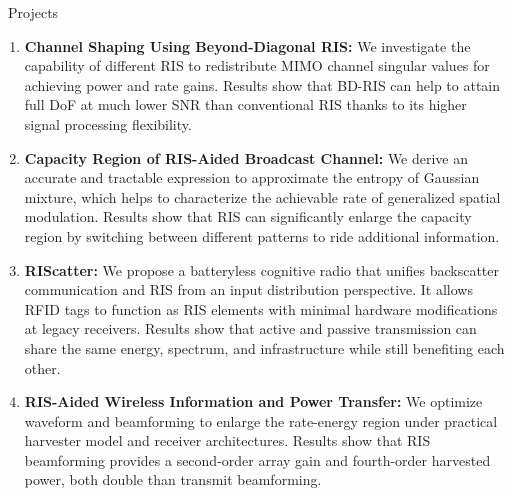 \documentclass{cv}
\begin{document}
\begin{section}{\faPaperPlane\ Projects}
	\begin{enumerate}
		\item \textbf{Channel Shaping Using Beyond-Diagonal RIS:} We investigate the capability of different RIS to redistribute MIMO channel singular values for achieving power and rate gains. Results show that BD-RIS can help to attain full DoF at much lower SNR than conventional RIS thanks to its higher signal processing flexibility.
		\item \textbf{Capacity Region of RIS-Aided Broadcast Channel:} We derive an accurate and tractable expression to approximate the entropy of Gaussian mixture, which helps to characterize the achievable rate of generalized spatial modulation. Results show that RIS can significantly enlarge the capacity region by switching between different patterns to ride additional information.
		\item \textbf{RIScatter:} We propose a batteryless cognitive radio that unifies backscatter communication and RIS from an input distribution perspective. It allows RFID tags to function as RIS elements with minimal hardware modifications at legacy receivers. Results show that active and passive transmission can share the same energy, spectrum, and infrastructure while still benefiting each other.
		\item \textbf{RIS-Aided Wireless Information and Power Transfer:} We optimize waveform and beamforming to enlarge the rate-energy region under practical harvester model and receiver architectures. Results show that RIS beamforming provides a second-order array gain and fourth-order harvested power, both double than transmit beamforming.
	\end{enumerate}
\end{section}

\vspace{-1em}
\end{document}
